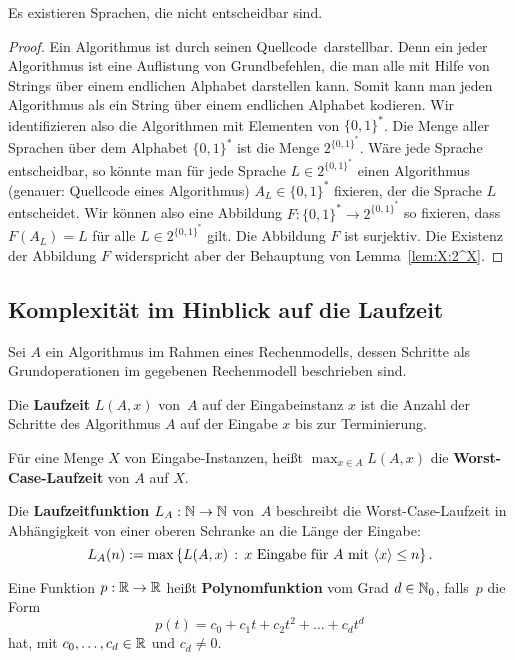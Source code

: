 \begin{thm}
	Es existieren Sprachen, die nicht entscheidbar sind. 
\end{thm} 
\begin{proof} 
		Ein Algorithmus ist durch seinen \glqq Quellcode\grqq\ darstellbar. Denn ein jeder Algorithmus ist eine Auflistung von Grundbefehlen, die man alle mit Hilfe von Strings über einem endlichen Alphabet darstellen kann. Somit kann  man jeden Algorithmus als ein String über einem endlichen Alphabet kodieren. Wir identifizieren also die Algorithmen mit Elementen von $\{0,1\}^\ast$. Die Menge aller Sprachen über dem Alphabet $\{0,1\}^\ast$ ist die Menge $2^{\{0,1\}^\ast}$. Wäre jede Sprache entscheidbar, so könnte man für jede Sprache $L \in 2^{\{0,1\}^\ast}$ einen Algorithmus (genauer: Quellcode eines Algorithmus) $A_L \in \{0,1\}^\ast$ fixieren, der die Sprache $L$ entscheidet. Wir können also eine Abbildung $F : \{0,1\}^\ast \to 2^{\{0,1\}^\ast}$ so fixieren, dass $F(A_L) = L$ für alle $L \in 2^{\{0,1\}^\ast}$ gilt. Die Abbildung $F$ ist surjektiv. Die Existenz der Abbildung $F$ widerspricht aber der Behauptung von Lemma~\ref{lem:X:2^X}.
\end{proof} 

\subsection{Komplexität im Hinblick auf die Laufzeit} 

\begin{defn} 
	Sei $A$ ein Algorithmus im Rahmen eines Rechenmodells, dessen Schritte als Grundoperationen im gegebenen Rechenmodell beschrieben sind. 

Die \textbf{Laufzeit} $L(A,x)$ von~$A$ auf der Eingabeinstanz $x$ ist die Anzahl der Schritte des Algorithmus $A$ auf der Eingabe $x$ bis zur Terminierung. 

Für eine Menge $X$ von Eingabe-Instanzen, heißt $\max_{x \in A} L(A,x)$ die \textbf{Worst-Case-Laufzeit} von $A$ auf $X$. 

Die \textbf{Laufzeitfunktion} $L_A : \mathbb{N} \to \mathbb{N}$ von~$A$ beschreibt die Worst-Case-Laufzeit in Abhängigkeit von einer oberen Schranke an die Länge der Eingabe: 
\[
L_A(n) := \max \setcond{  L(A,x) }{x \ \text{Eingabe für} \ A  \ \text{mit} \ \encl{x} \le n}.
\]
\end{defn} 

\begin{defn}
	Eine Funktion $p : \mathbb{R} \to \mathbb{R}$ heißt \textbf{Polynomfunktion} vom Grad $d \in \mathbb{N}_0$, falls~$p$ die Form \[
		p(t)= c_0 + c_1 t + c_2 t^2 + \ldots + c_d t^d
	\]
	hat, mit $c_0,\ldots,c_d \in \mathbb{R}$ und $c_d \ne 0$. 
\end{defn} 

